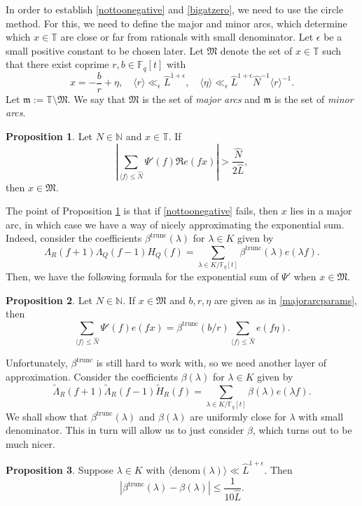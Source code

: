 \documentclass{article}
\theoremstyle{definition}
\newtheorem{prop}{Proposition}[section]
\theoremstyle{definition}
\theoremstyle{remark}
\newcommand{\N}{\mathbb{N}}
\newcommand{\F}{\mathbb{F}_q[t]}
\newcommand{\1}{\mathbf{1}}
\numberwithin{equation}{section}
\begin{document}
In order to establish \eqref{nottoonegative} and \eqref{bigatzero}, we need to use the circle method. For this, we need to define the major and minor arcs, which determine which $x\in \mathbb{T}$ are close or far from rationals with small denominator. Let $\epsilon$ be a small positive constant to be chosen later. Let $\mathfrak{M}$ denote the set of $x\in \mathbb{T}$ such that there exist coprime $r,b \in \F$ with 
\begin{equation}\label{majorarcparams}
x= -\frac{b}{r}+\eta,\quad \langle r \rangle \ll_{\epsilon} \widehat{L}^{1+\epsilon},\quad\langle \eta \rangle \ll_{\epsilon} \widehat{L}^{1+\epsilon}\widehat{N}^{-1}\langle r \rangle^{-1}.
\end{equation}
 Let $\mathfrak{m}:=\mathbb{T}\setminus\mathfrak{M}$. We say that $\mathfrak{M}$ is the set of \textit{major arcs} and $\mathfrak{m}$ is the set of \textit{minor arcs}. 
\begin{prop}\label{minorarcs} Let $N\in \N$ and $x\in \mathbb{T}$. If 
\[\left|\sum_{\langle f\rangle \leq \widehat{N}} \Psi'(f)\Re e(fx)\right|>\frac{\widehat{N}}{2\widehat{L}},\]
then $x\in \mathfrak{M}$. 
\end{prop}
The point of Proposition \ref{minorarcs} is that if \eqref{nottoonegative} fails, then $x$ lies in a major arc, in which case we have a way of nicely approximating the exponential sum. Indeed, consider the coefficients $\beta^{\text{trunc}}(\lambda)$ for $\lambda\in K$ given by 
\[\Lambda_R(f+1)\Lambda_Q(f-1)H_Q(f)=\sum_{\lambda \in K\slash \F} \beta^{\text{trunc}}(\lambda) e(\lambda f). \]
Then, we have the following formula for the exponential sum of $\Psi'$ when $x\in \mathfrak{M}$.

\begin{prop}\label{majorarcformula}
Let $N\in \N$. If $x\in \mathfrak{M}$ and $b,r,\eta$ are given as in \eqref{majorarcparams}, then 
\[\sum_{\langle f\rangle \leq \widehat{N}} \Psi'(f)e(fx) =\beta^{\text{trunc}}(b\slash r)\sum_{\langle f\rangle \leq \widehat{N}} e(f\eta).\]
\end{prop}

Unfortunately, $\beta^{\text{trunc}}$ is still hard to work with, so we need another layer of approximation. Consider the coefficients $\beta(\lambda)$ for $\lambda\in K$ given by 
\[\widetilde{\Lambda}_R(f+1)\widetilde{\Lambda}_R(f-1)\widetilde{H}_R(f)=\sum_{\lambda \in K\slash \F} \beta(\lambda) e(\lambda f). \]
We shall show that $\beta^{\text{trunc}}(\lambda)$ and $\beta(\lambda)$ are uniformly close for $\lambda$ with small denominator. This in turn will allow us to just consider $\beta$, which turns out to be much nicer. 
\begin{prop}\label{betasclose}Suppose $\lambda\in K$ with $\langle \text{denom}(\lambda)\rangle \ll \widehat{L}^{1+\epsilon}$. Then 
\[|\beta^{\text{trunc}}(\lambda)-\beta(\lambda)|\leq \frac{1}{10\widehat{L}}.\]
\end{prop}
\end{document}
